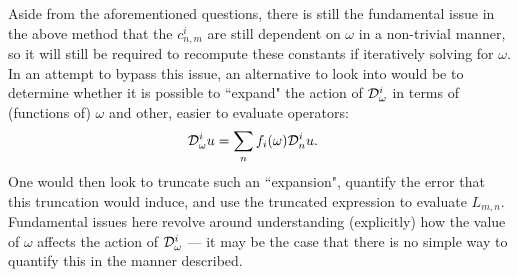 Aside from the aforementioned questions, there is still the fundamental issue in the above method that the $c_{n,m}^i$ are still dependent on $\omega$ in a non-trivial manner, so it will still be required to recompute these constants if iteratively solving for $\omega$.
In an attempt to bypass this issue, an alternative to look into would be to determine whether it is possible to ``expand" the action of $\mathcal{D}_{\omega}^i$ in terms of (functions of) $\omega$ and other, easier to evaluate operators:
\begin{align*}
	\mathcal{D}_{\omega}^i u &= \sum_n f_i(\omega)\mathcal{D}_n^i u.
\end{align*}
One would then look to truncate such an ``expansion", quantify the error that this truncation would induce, and use the truncated expression to evaluate $L_{m,n}$.
Fundamental issues here revolve around understanding (explicitly) how the value of $\omega$ affects the action of $\mathcal{D}_\omega^i$ --- it may be the case that there is no simple way to quantify this in the manner described.